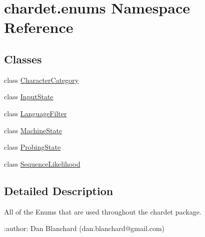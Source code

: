 \hypertarget{namespacechardet_1_1enums}{}\section{chardet.\+enums Namespace Reference}
\label{namespacechardet_1_1enums}
\subsection*{Classes}
\begin{DoxyCompactItemize}
\item 
class \hyperlink{classchardet_1_1enums_1_1_character_category}{Character\+Category}
\item 
class \hyperlink{classchardet_1_1enums_1_1_input_state}{Input\+State}
\item 
class \hyperlink{classchardet_1_1enums_1_1_language_filter}{Language\+Filter}
\item 
class \hyperlink{classchardet_1_1enums_1_1_machine_state}{Machine\+State}
\item 
class \hyperlink{classchardet_1_1enums_1_1_probing_state}{Probing\+State}
\item 
class \hyperlink{classchardet_1_1enums_1_1_sequence_likelihood}{Sequence\+Likelihood}
\end{DoxyCompactItemize}


\subsection{Detailed Description}
\begin{DoxyVerb}All of the Enums that are used throughout the chardet package.

:author: Dan Blanchard (dan.blanchard@gmail.com)
\end{DoxyVerb}
 